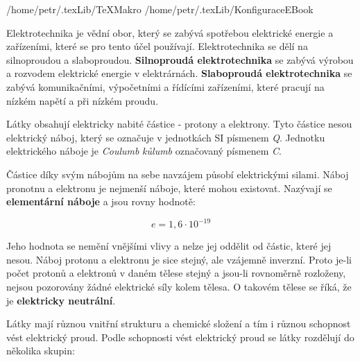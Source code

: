 \def\ddr{/home/petr/.texLib}

 \ddr/TeXMakro
\setAddress{\ddr}
 \ddr/KonfiguraceEBook



\Obsah



Elektrotechnika je vědní obor, který se zabývá spotřebou elektrické energie a zařízeními, které se pro tento účel používají. Elektrotechnika se dělí na silnoproudou a slaboproudou. {\bf Silnoproudá elektrotechnika} se zabývá výrobou a rozvodem elektrické energie v elektrárnách. {\bf Slaboproudá elektrotechnika} se zabývá komunikačními, výpočetními a řídícími zařízeními, které pracují na nízkém napětí a při nízkém proudu.



Látky obsahují elektricky nabité částice - protony a elektrony. Tyto částice nesou elektrický náboj, který se označuje v jednotkách SI písmenem {\it Q}. Jednotku elektrického náboje je {\it Coulumb} {\it kůlumb} označovaný písmenem {\it C}.

Částice díky svým nábojům na sebe navzájem působí elektrickými silami. Náboj pronotnu a elektronu je nejmenší náboje, které mohou existovat. Nazývají se {\bf elementární náboje} a jsou rovny hodnotě:

$$ e = 1,6 \cdot 10^{-19}$$

Jeho hodnota se nemění vnějšími vlivy a nelze jej oddělit od částic, které jej nesou. Náboj protonu a elektronu je sice stejný, ale vzájemně inverzní. Proto je-li počet protonů a elektronů v daném tělese stejný a jsou-li rovnoměrně rozloženy, nejsou pozorovány žádné elektrické síly kolem tělesa. O takovém tělese se říká, že je {\bf elektricky neutrální}.








Látky mají různou vnitřní strukturu a chemické složení a tím i různou schopnost vést elektrický proud. Podle schopnosti vést elektrický proud se látky rozdělují do několika skupin:

